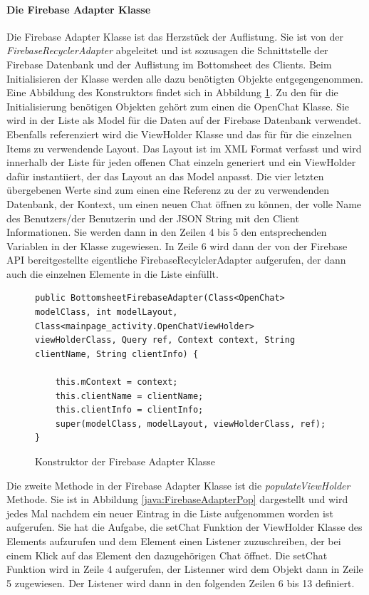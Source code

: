 \documentclass[a4paper,11pt]{report}
\begin{document}
			\paragraph{Die Firebase Adapter Klasse} 		
			Die Firebase Adapter Klasse ist das Herzstück der Auflistung. Sie ist von der \emph{FirebaseRecyclerAdapter} abgeleitet und ist sozusagen die Schnittstelle der Firebase Datenbank und der Auflistung im Bottomsheet des Clients. Beim Initialisieren der Klasse werden alle dazu benötigten Objekte entgegengenommen. Eine Abbildung des Konstruktors findet sich in Abbildung \ref{java:firebaseAdapterKonst}. Zu den für die Initialisierung benötigen Objekten gehört zum einen die OpenChat Klasse. Sie wird in der Liste als Model für die Daten auf der Firebase Datenbank verwendet. Ebenfalls referenziert wird die ViewHolder Klasse und das für für die einzelnen Items zu verwendende Layout. Das Layout ist im XML Format verfasst und wird innerhalb der Liste für jeden offenen Chat einzeln generiert und ein ViewHolder dafür instantiiert, der das Layout an das Model anpasst. Die vier letzten übergebenen Werte sind zum einen eine Referenz zu der zu verwendenden Datenbank, der Kontext, um einen neuen Chat öffnen zu können, der volle Name des Benutzers/der Benutzerin und der JSON String mit den Client Informationen. Sie werden dann in den Zeilen 4 bis 5 den entsprechenden Variablen in der Klasse zugewiesen. In Zeile 6 wird dann der von der Firebase API bereitgestellte eigentliche FirebaseRecylclerAdapter aufgerufen, der dann auch die einzelnen Elemente in die Liste einfüllt.
\begin{figure}
	\begin{center}
		\begin{verbatim}
public BottomsheetFirebaseAdapter(Class<OpenChat> modelClass, int modelLayout, Class<mainpage_activity.OpenChatViewHolder> viewHolderClass, Query ref, Context context, String clientName, String clientInfo) {
	
	this.mContext = context;
	this.clientName = clientName;
	this.clientInfo = clientInfo;
	super(modelClass, modelLayout, viewHolderClass, ref);
}
		\end{verbatim}
		\caption{Konstruktor der Firebase Adapter Klasse}\label{java:firebaseAdapterKonst}
	\end{center}

\end{figure}

			Die zweite Methode in der Firebase Adapter Klasse ist die \emph{populateViewHolder} Methode. Sie ist in Abbildung \ref{java:FirebaseAdapterPop} dargestellt und wird jedes Mal nachdem ein neuer Eintrag in die Liste aufgenommen worden ist aufgerufen. Sie hat die Aufgabe, die setChat Funktion der ViewHolder Klasse des Elements aufzurufen und dem Element einen Listener zuzuschreiben, der bei einem Klick auf das Element den dazugehörigen Chat öffnet. Die setChat Funktion wird in Zeile 4 aufgerufen, der Listenner wird dem Objekt dann in Zeile 5 zugewiesen. Der Listener wird dann in den folgenden Zeilen 6 bis 13 definiert.
			
\end{document}
